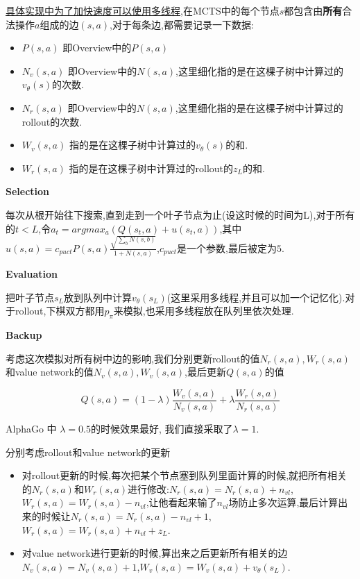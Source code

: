 \documentclass[twocolumn]{article}
\begin{document}
\underline{具体实现中为了加快速度可以使用多线程},在MCTS中的每个节点$s$都包含由\textbf{所有}合法操作$a$组成的边$(s,a)$,对于每条边,都需要记录一下数据:

\begin{itemize}
	\item $P(s, a)$ 即Overview中的$P(s, a)$
	\item $N_v(s, a)$ 即Overview中的$N(s, a)$,这里细化指的是在这棵子树中计算过的$v_\theta(s)$的次数.
	\item $N_r(s, a)$ 即Overview中的$N(s, a)$,这里细化指的是在这棵子树中计算过的rollout的次数.
	\item $W_v(s, a)$ 指的是在这棵子树中计算过的$v_\theta(s)$的和.
	\item $W_r(s, a)$ 指的是在这棵子树中计算过的rollout的$z_L$的和.
\end{itemize}

\noindent\textbf{Selection}

每次从根开始往下搜索,直到走到一个叶子节点为止(设这时候的时间为L),对于所有的$t < L$,令$a_t = argmax_a(Q(s_t, a) + u(s_t, a))$,其中$u(s, a) = c_{puct}P(s, a)\frac{\sqrt{\sum_{b}N(s,b)}}{1+N(s,a)}$,$c_{puct}$是一个参数,最后被定为$5$.

\noindent\textbf{Evaluation}

把叶子节点$s_L$放到队列中计算$v_\theta(s_L)$(这里采用多线程,并且可以加一个记忆化).对于rollout,下棋双方都用$p_\pi$来模拟,也采用多线程放在队列里依次处理.

\noindent\textbf{Backup}

考虑这次模拟对所有树中边的影响,我们分别更新rollout的值$N_r(s, a), W_r(s, a)$和value network的值$N_v(s, a), W_v(s, a)$,最后更新$Q(s, a)$的值

\[
Q(s, a) = (1 - \lambda)\frac{W_v(s,a)}{N_v(s,a)}+\lambda\frac{W_r(s,a)}{N_r(s,a)}
\]

AlphaGo 中 $\lambda=0.5$的时候效果最好, 我们直接采取了$\lambda=1$.

分别考虑rollout和value network的更新

\begin{itemize}
	\item 对rollout更新的时候,每次把某个节点塞到队列里面计算的时候,就把所有相关的$N_r(s,a)$和$W_r(s,a)$进行修改:$N_r(s,a)=N_r(s,a)+n_{vl}$, $W_r(s,a)=W_r(s,a)-n_{vl}$,让他看起来输了$n_{vl}$场防止多次运算,最后计算出来的时候让$N_r(s,a)=N_r(s,a)-n_{vl}+1$, $W_r(s,a)=W_r(s,a)+n_{vl}+z_L$.
	\item 对value network进行更新的时候,算出来之后更新所有相关的边$N_v(s,a)=N_v(s,a)+1$,$W_v(s,a)=W_v(s,a)+v_\theta(s_L)$.
\end{itemize}
\end{document}
